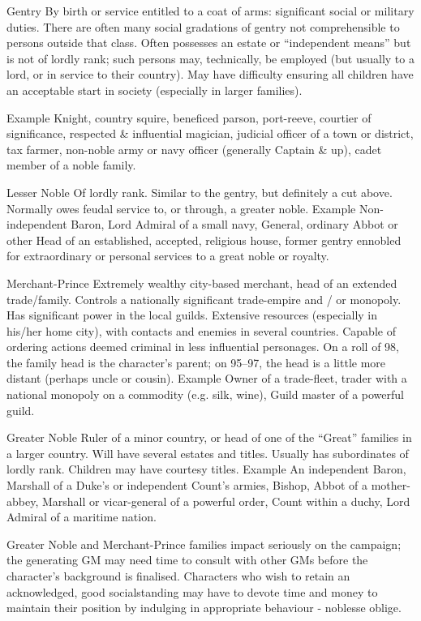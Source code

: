 \documentclass[a4paper]{article}
\begin{document}
\begin{multicols}{3}
Gentry By birth or service entitled to a coat of
arms: significant social or military duties. There
are often many social gradations of gentry not
comprehensible to persons outside that class. Often
possesses an estate or “independent means” but is
not of lordly rank; such persons may, technically,
be employed (but usually to a lord, or in service to
their country). May have difficulty ensuring all
children have an acceptable start in society (especially in larger families).

Example
Knight, country squire, beneficed parson,
port-reeve, courtier of significance, respected \& influential
magician, judicial officer of a town or district, tax farmer,
non-noble army or navy officer (generally Captain \& up),
cadet member of a noble family.

Lesser Noble Of lordly rank. Similar to the gentry,
but definitely a cut above. Normally owes feudal
service to, or through, a greater noble.
Example
Non-independent Baron, Lord Admiral of a
small navy, General, ordinary Abbot or other Head of an
established, accepted, religious house, former gentry
ennobled for extraordinary or personal services to a great
noble or royalty.

Merchant-Prince Extremely wealthy city-based
merchant, head of an extended trade/family. Controls a nationally significant trade-empire and / or
monopoly. Has significant power in the local
guilds. Extensive resources (especially in his/her
home city), with contacts and enemies in several
countries. Capable of ordering actions deemed
criminal in less influential personages. On a roll of
98, the family head is the character’s parent; on
95–97, the head is a little more distant (perhaps
uncle or cousin).
Example
Owner of a trade-fleet, trader with a national monopoly on a commodity (e.g. silk, wine), Guild
master of a powerful guild.

Greater Noble Ruler of a minor country, or head
of one of the “Great” families in a larger country.
Will have several estates and titles. Usually has
subordinates of lordly rank. Children may have
courtesy titles.
Example
An independent Baron, Marshall of a
Duke’s or independent Count’s armies, Bishop, Abbot of a
mother-abbey, Marshall or vicar-general of a powerful
order, Count within a duchy, Lord Admiral of a maritime
nation.

Greater Noble and Merchant-Prince families impact seriously on the campaign; the generating GM
may need time to consult with other GMs before
the character’s background is finalised. Characters
who wish to retain an acknowledged, good socialstanding may have to devote time and money to
maintain their position by indulging in appropriate
behaviour - noblesse oblige.


\end{multicols}
\end{document}
